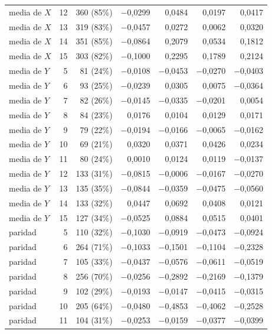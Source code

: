 \begin{table}[htbp]
{\begin{tabular}{@{}lrrrrrr@{}}
        media de $X$ & 12 & 360 (85\%) & $-$0,0299 & 0,0484 & 0,0197 & 0,0417 \\
        media de $X$ & 13 & 319 (83\%) & $-$0,0457 & 0,0272 & 0,0062 & 0,0320 \\
        media de $X$ & 14 & 351 (85\%) & $-$0,0864 & 0,2079 & 0,0534 & 0,1812 \\
        media de $X$ & 15 & 303 (82\%) & $-$0,1000 & 0,2295 & 0,1789 & 0,2124 \\
        media de $Y$ & 5 & 81 (24\%) & $-$0,0108 & $-$0,0453 & $-$0,0270 & $-$0,0403 \\
        media de $Y$ & 6 & 93 (25\%) & $-$0,0239 & 0,0305 & 0,0075 & $-$0,0364 \\
        media de $Y$ & 7 & 82 (26\%) & $-$0,0145 & $-$0,0335 & $-$0,0201 & 0,0054 \\
        media de $Y$ & 8 & 84 (23\%) & 0,0176 & 0,0104 & 0,0129 & 0,0171 \\
        media de $Y$ & 9 & 79 (22\%) & $-$0,0194 & $-$0,0166 & $-$0,0065 & $-$0,0162 \\
        media de $Y$ & 10 & 69 (21\%) & 0,0320 & 0,0371 & 0,0426 & 0,0234 \\
        media de $Y$ & 11 & 80 (24\%) & 0,0010 & 0,0124 & 0,0119 & $-$0,0137 \\
        media de $Y$ & 12 & 133 (31\%) & $-$0,0815 & $-$0,0006 & $-$0,0167 & $-$0,0270 \\
        media de $Y$ & 13 & 135 (35\%) & $-$0,0844 & $-$0,0359 & $-$0,0475 & $-$0,0560 \\
        media de $Y$ & 14 & 133 (32\%) & 0,0447 & 0,0692 & 0,0408 & 0,0121 \\
        media de $Y$ & 15 & 127 (34\%) & $-$0,0525 & 0,0884 & 0,0515 & 0,0401 \\
        paridad & 5 & 110 (32\%) & $-$0,1030 & $-$0,0919 & $-$0,0473 & $-$0,0924 \\
        paridad & 6 & 264 (71\%) & $-$0,1033 & $-$0,1501 & $-$0,1104 & $-$0,2328 \\
        paridad & 7 & 105 (33\%) & $-$0,0437 & $-$0,0576 & $-$0,0611 & $-$0,0519 \\
        paridad & 8 & 256 (70\%) & $-$0,0256 & $-$0,2892 & $-$0,2169 & $-$0,1379 \\
        paridad & 9 & 102 (29\%) & $-$0,0193 & $-$0,0147 & $-$0,0415 & $-$0,0315 \\
        paridad & 10 & 205 (64\%) & $-$0,0480 & $-$0,4853 & $-$0,4062 & $-$0,2528 \\
        paridad & 11 & 104 (31\%) & $-$0,0253 & $-$0,0159 & $-$0,0377 & $-$0,0399 \\

\end{tabular}}
\end{table}

